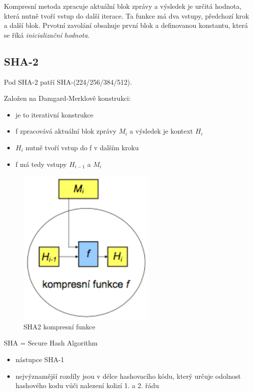 \documentclass{szzclass}
\begin{document}
Kompresní metoda zpracuje aktuální blok zprávy a výsledek je určitá hodnota, která nutně tvoří vstup do další iterace. Ta funkce má dva vstupy, předchozí krok a další blok.
Prvotní zavolání obsahuje první blok a definovanou konstantu, která se říká \textit{inicializační hodnota}.

\subsection{SHA-2}
Pod SHA-2 patří SHA-(224/256/384/512).

Založen na Damgard-Merklově konstrukci:
\begin{itemize}
    \item je to iterativní konstrukce
    \item f zpracovává aktuální blok zprávy $M_i$ a výsledek je kontext $H_i$
    \item $H_i$ nutně tvoří vstup do f v dalším kroku
    \item f má tedy vstupy $H_{i-1}$ a $M_i$
\end{itemize}

\begin{figure}[h!]
    \centering
    \includegraphics[width=0.6\textwidth]{topics/bi-spol-06/image/sha2.png}
    \caption{SHA2 kompresní funkce}
\end{figure}

SHA = Secure Hash Algorithm
\begin{itemize}
    \item nástupce SHA-1
    \item nejvýznamější rozdíly jsou v délce hashovacího kódu, který určuje odolnost hashového kodu vůči
     nalezení kolizí 1. a 2. řádu
\end{itemize}
\end{document}
